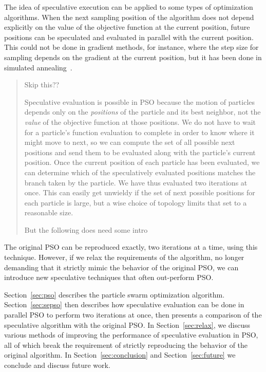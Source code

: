 \documentclass[journal,letterpaper]{IEEEtran}
\renewcommand{\sec}[1]{Section~\ref{sec:#1}}
\begin{document}
The idea of speculative execution can be applied to some types of optimization
algorithms.  When the next sampling position of the algorithm does not depend
explicitly on the value of the objective function at the current position,
future positions can be speculated and evaluated in parallel with the current
position.  This could not be done in gradient methods, for instance, where the
step size for sampling depends on the gradient at the current position, but it
has been done in simulated annealing~\cite{witte-tpds91}.

\begin{quote}
Skip this??

Speculative evaluation is possible in PSO because the motion of particles
depends only on the \emph{positions} of the particle and its best neighbor, not
the \emph{value} of the objective function at those positions.  We do not have
to wait for a particle's function evaluation to complete in order to know where
it might move to next, so we can compute the set of all possible next positions
and send them to be evaluated along with the particle's current position.  Once
the current position of each particle has been evaluated, we can determine
which of the speculatively evaluated positions matches the branch taken by the
particle.  We have thus evaluated two iterations at once.  This can easily get
unwieldy if the set of next possible positions for each particle is large, but
a wise choice of topology limits that set to a reasonable size.

But the following does need some intro
\end{quote}

The original PSO can be reproduced exactly, two iterations at a time, using
this technique.  However, if we relax the requirements of the algorithm, no
longer demanding that it strictly mimic the behavior of the original PSO, we
can introduce new speculative techniques that often out-perform PSO.  

\sec{pso} describes the particle swarm optimization algorithm.  \sec{sepso}
then describes how speculative evaluation can be done in parallel PSO to
perform two iterations at once, then presents a comparison of the speculative
algorithm with the original PSO.  In \sec{relax}, we discuss various methods of
improving the performance of speculative evaluation in PSO, all of which break
the requirement of strictly reproducing the behavior of the original algorithm.
In \sec{conclusion} and \sec{future} we conclude and discuss future work.
\end{document}
